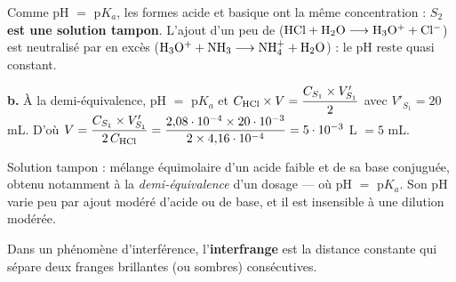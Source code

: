\documentclass[11pt]{article}
\begin{document}
 Comme pH $=$ p$K_a$, les formes acide et basique ont la même concentration : $S_2$ \textbf{est une solution tampon}. L'ajout d'un peu de  ($\mathrm{HCl + H_2O \longrightarrow H_3O^+ + Cl^-}$) est neutralisé par  en excès ($\mathrm{H_3O^+ + NH_3 \longrightarrow NH_4^+ + H_2O}$) : le pH reste quasi constant.

\textbf{b.} À la demi-équivalence, pH $=$ p$K_a$ et $C_{\mathrm{HCl}}\times V = \dfrac{C_{S_1}\times V'_{S_1}}{2}$ avec $V'_{S_1} = 20$ mL. D'où $V = \dfrac{C_{S_1}\times V'_{S_1}}{2\,C_{\mathrm{HCl}}} = \dfrac{2{,}08\cdot10^{-4}\times 20\cdot10^{-3}}{2\times 4{,}16\cdot10^{-4}} = 5\cdot10^{-3}$ L $= 5$ mL.

\begin{rappel}
Solution tampon : mélange équimolaire d'un acide faible et de sa base
conjuguée, obtenu notamment à la \emph{demi-équivalence} d'un dosage —
où pH $=$ p$K_a$. Son pH varie peu par ajout modéré d'acide ou de base,
et il est insensible à une dilution modérée.
\end{rappel}


Dans un phénomène d'interférence, l'\textbf{interfrange} est la distance constante qui sépare deux franges brillantes (ou sombres) consécutives.

\begin{center}
\end{center}
\end{document}
